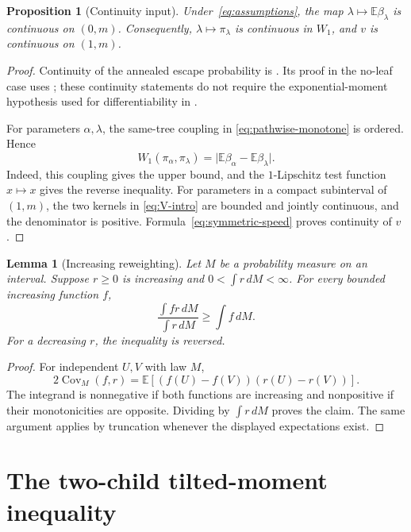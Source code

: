 \documentclass[11pt,a4paper]{article}
\numberwithin{equation}{section}
\theoremstyle{plain}
\newtheorem{proposition}[proposition]{Proposition}
\newtheorem{lemma}[lemma]{Lemma}
\theoremstyle{definition}
\theoremstyle{remark}
\newcommand{\E}{\mathbb E}
\newcommand{\Cov}{\operatorname{Cov}}
\begin{document}
\begin{proposition}[Continuity input]\label{prop:continuity}
Under~\eqref{eq:assumptions}, the map
$\lambda\mapsto\E\beta_\lambda$ is continuous on $(0,m)$.
Consequently, $\lambda\mapsto\pi_\lambda$ is continuous in $W_1$, and
$v$ is continuous on $(1,m)$.
\end{proposition}
\begin{proof}
Continuity of the annealed escape probability is
\cite[Proposition 2.9]{BT20}.  Its proof in the no-leaf case uses
\cite[Lemma 4.7]{BT20}; these continuity statements do not require the
exponential-moment hypothesis used for differentiability in
\cite[Theorem 1.1]{BT20}.

For parameters $\alpha,\lambda$, the same-tree coupling in
\eqref{eq:pathwise-monotone} is ordered.  Hence
\begin{equation}\label{eq:w1-cont}
 W_1(\pi_\alpha,\pi_\lambda)
 =\bigl|\E\beta_\alpha-\E\beta_\lambda\bigr|.
\end{equation}
Indeed, this coupling gives the upper bound, and the $1$-Lipschitz test
function $x\mapsto x$ gives the reverse inequality.  For parameters in a
compact subinterval of $(1,m)$, the two kernels in
\eqref{eq:V-intro} are bounded and jointly continuous, and the denominator
is positive.  Formula~\eqref{eq:symmetric-speed} proves continuity of $v$.
\end{proof}

\begin{lemma}[Increasing reweighting]\label{lem:tilt}
Let $M$ be a probability measure on an interval.  Suppose $r\ge0$ is
increasing and $0<\int r\,dM<\infty$.  For every bounded increasing
function $f$,
\begin{equation}\label{eq:tilt}
 \frac{\int fr\,dM}{\int r\,dM}\ge\int f\,dM.
\end{equation}
For a decreasing $r$, the inequality is reversed.
\end{lemma}
\begin{proof}
For independent $U,V$ with law $M$,
\begin{equation}
 2\Cov_M(f,r)
 =\E[(f(U)-f(V))(r(U)-r(V))].
\end{equation}
The integrand is nonnegative if both functions are increasing and
nonpositive if their monotonicities are opposite.  Dividing by
$\int r\,dM$ proves the claim.  The same argument applies by truncation
whenever the displayed expectations exist.
\end{proof}

\section{The two-child tilted-moment inequality}\label{sec:moments}
\end{document}
